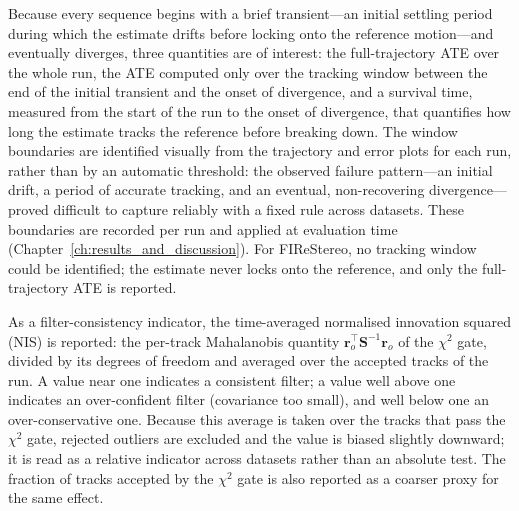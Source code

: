 Because every sequence begins with a brief transient---an initial settling period during which the estimate drifts before locking onto the reference motion---and eventually diverges, three quantities are of interest: the full-trajectory ATE over the whole run, the ATE computed only over the tracking window between the end of the initial transient and the onset of divergence, and a survival time, measured from the start of the run to the onset of divergence, that quantifies how long the estimate tracks the reference before breaking down. The window boundaries are identified visually from the trajectory and error plots for each run, rather than by an automatic threshold: the observed failure pattern---an initial drift, a period of accurate tracking, and an eventual, non-recovering divergence---proved difficult to capture reliably with a fixed rule across datasets. These boundaries are recorded per run and applied at evaluation time (Chapter~\ref{ch:results_and_discussion}). For FIReStereo, no tracking window could be identified; the estimate never locks onto the reference, and only the full-trajectory ATE is reported.

As a filter-consistency indicator, the time-averaged normalised innovation squared (NIS) is reported: the per-track Mahalanobis quantity $\mathbf{r}_o^{\top}\mathbf{S}^{-1}\mathbf{r}_o$ of the $\chi^2$ gate, divided by its degrees of freedom and averaged over the accepted tracks of the run. A value near one indicates a consistent filter; a value well above one indicates an over-confident filter (covariance too small), and well below one an over-conservative one. Because this average is taken over the tracks that pass the $\chi^2$ gate, rejected outliers are excluded and the value is biased slightly downward; it is read as a relative indicator across datasets rather than an absolute test. The fraction of tracks accepted by the $\chi^2$ gate is also reported as a coarser proxy for the same effect.

